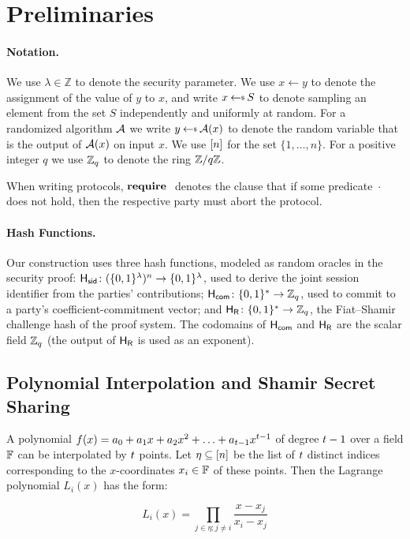 \section{Preliminaries}

\paragraph{Notation.}
We use $\lambda \in \mathbb{Z}$ to denote the security parameter.
We use $x \gets y$ to denote the assignment of the value of $y$ to $x$,
and write $x \rgets S$ to denote sampling an element from the set $S$ independently and uniformly at random.
For a randomized algorithm $\mathcal{A}$ we write $y \rgets \adv(x)$ to denote the random variable
that is the output of $\mathcal{A}(x)$ on input $x$.
%
We use $[n]$ for the set $\{1,\ldots,n\}$.
%
For a positive integer $q$ we use $\mathbb{Z}_q$ to denote the ring $\mathbb{Z}/q\mathbb{Z}$.

When writing protocols,
$\mathbf{require}~$ denotes the clause that if some predicate~$\cdot$ does not hold,
then the respective party must abort the protocol.

\paragraph{Hash Functions.}
Our construction uses three hash functions, modeled as random oracles in the security proof:
$\mathsf{H_{\mathsf{sid}}} \colon (\{0,1\}^\lambda)^n \to \{0,1\}^\lambda$, used to derive the joint session identifier from the
parties' contributions;
$\mathsf{H_{\mathsf{com}}} \colon \{0,1\}^* \to \mathbb{Z}_q$, used to commit to a party's coefficient-commitment vector; and
$\mathsf{H_{\mathsf{R}}} \colon \{0,1\}^* \to \mathbb{Z}_q$, the Fiat--Shamir challenge hash of the proof system.
The codomains of $\mathsf{H_{\mathsf{com}}}$ and $\mathsf{H_{\mathsf{R}}}$ are the scalar field $\mathbb{Z}_q$
(the output of $\mathsf{H_{\mathsf{R}}}$ is used as an exponent).

\subsection{Polynomial Interpolation and Shamir Secret Sharing}
\label{prelim:secret-sharing}

A polynomial $f(x) = a_0 + a_1 x + a_2 x^2 + \ldots + a_{t-1} x^{t-1}$
of degree $t-1$ over a field $\mathbb{F}$ can be interpolated by $t$ points.
Let $\eta \subseteq [n]$ be the list of $t$ distinct indices
corresponding to the $x$-coordinates $x_i \in \mathbb{F}$ of these points.
Then the Lagrange polynomial $L_i(x)$ has the form:

\[
  L_i(x) = \prod_{j \in \eta; j \neq i } \frac{x-x_j}{x_i - x_j}
\]


